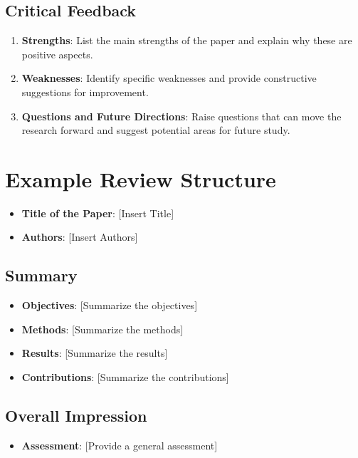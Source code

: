 \documentclass[12pt]{article}
\begin{document}
\subsection{Critical Feedback}
\begin{enumerate}
    \item \textbf{Strengths}: List the main strengths of the paper and explain why these are positive aspects.
    \item \textbf{Weaknesses}: Identify specific weaknesses and provide constructive suggestions for improvement.
    \item \textbf{Questions and Future Directions}: Raise questions that can move the research forward and suggest potential areas for future study.
\end{enumerate}

\section{Example Review Structure}

\begin{itemize}
    \item \textbf{Title of the Paper}: [Insert Title]
    \item \textbf{Authors}: [Insert Authors]
\end{itemize}

\subsection{Summary}
\begin{itemize}
    \item \textbf{Objectives}: [Summarize the objectives]
    \item \textbf{Methods}: [Summarize the methods]
    \item \textbf{Results}: [Summarize the results]
    \item \textbf{Contributions}: [Summarize the contributions]
\end{itemize}

\subsection{Overall Impression}
\begin{itemize}
    \item \textbf{Assessment}: [Provide a general assessment]
\end{itemize}
\end{document}
